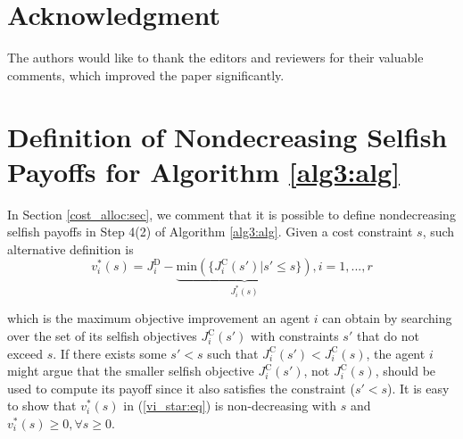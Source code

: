 \documentclass[12pt, draftclsnofoot,onecolumn]{IEEEtran}
\begin{document}
\section*{Acknowledgment}
The authors would like to thank the editors and reviewers for their valuable comments, which improved the paper significantly.




































\appendices


\section{Definition of Nondecreasing Selfish Payoffs for Algorithm \ref{alg3:alg}}

\label{B:appendix}
In Section \ref{cost_alloc:sec}, we comment that it is possible to define nondecreasing selfish payoffs in Step 4(2) of Algorithm \ref{alg3:alg}. Given a cost constraint $s$, such alternative definition is 
\begin{equation}
v_i^*(s) = J_i^{\mathrm{D}}-\underbrace{\mathrm{min}(\{J_i^{\mathrm{C}}(s')| s'\leq s\})}_{J_i^*(s)}, i=1,...,r
\label{vi_star:eq}
\end{equation}

\noindent which is the maximum objective improvement an agent $i$ can obtain by searching over the set of its selfish objectives $J_i^{\mathrm{C}}(s')$ with constraints $s'$ that do not exceed $s$. If there exists some $s' < s$ such that $J_i^{\mathrm{C}}(s') < J_i^{\mathrm{C}}(s)$, the agent $i$ might argue that the smaller selfish objective $J_i^{\mathrm{C}}(s')$, not $J_i^{\mathrm{C}}(s)$, should be used to compute its payoff since it also satisfies the constraint ($s'<s$). It is easy to show that $v_i^*(s)$ in (\ref{vi_star:eq}) is non-decreasing with $s$ and $v_i^*(s)\geq0, \forall s\geq 0$. 
\end{document}
